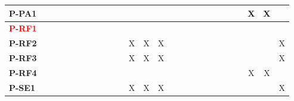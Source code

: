 \documentclass[12pt]{article}
\begin{document}
\begin{table}[H]
\begin{adjustwidth}{-1.4in}{-1in}
{\begin{tabular}{c|c|c|c|c|c|c|c|c|c|c|c|c|c|c|c|c|c|c|c|c|c|c|c|c|c|}
  \multicolumn{1}{|l|}{\textbf{P-PA1}}   &              &              &              &              &              &              &              &              &              &              &              &              &              &              &              &              &              &              &              &              &              &              &       X      &       X      &               \\ \hline
  \multicolumn{1}{|l|}{\textbf{\textcolor{red}{P-RF1}}}   &              &              &              &              &              &              &              &              &              &              &              &              &              &              &              &              &              &              &              &              &              &              &              &              &               \\ \hline
  \multicolumn{1}{|l|}{\textbf{P-RF2}}   &              &              &              &              &              &              &              &              &              &              &       X      &       X      &       X      &              &              &              &              &              &              &              &              &              &              &              &       X       \\ \hline
  \multicolumn{1}{|l|}{\textbf{P-RF3}}   &              &              &              &              &              &              &              &              &              &              &       X      &       X      &       X      &              &              &              &              &              &              &              &              &              &              &              &       X       \\ \hline
  \multicolumn{1}{|l|}{\textbf{P-RF4}}   &              &              &              &              &              &              &              &              &              &              &              &              &              &              &              &              &              &              &              &              &              &              &       X      &       X      &               \\ \hline
  \multicolumn{1}{|l|}{\textbf{P-SE1}}   &              &              &              &              &              &              &              &              &              &              &       X      &       X      &       X      &              &              &              &              &              &              &              &              &              &              &              &       X       \\ \hline

\end{tabular}}
\end{adjustwidth}
\end{table}
\end{document}
